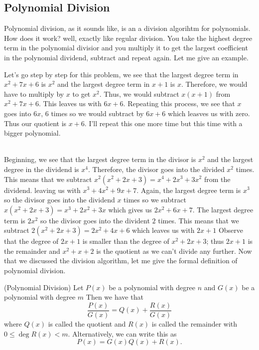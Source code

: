 \documentclass[11pt]{article}
\begin{document}
\subsection{Polynomial Division}
 Polynomial division, as it sounds like, is an a division algorihtm for polynomials. How does it work? well, exactly like regular division. You take the highest degree term in the polynomial divisior and you multiply it to get the largest coefficient in the polynomial dividend, subtract and repeat again. Let me give an example. 
\center {} \\ \raggedright Let's go step by step for this problem, we see that the largest degree term in $x^2+7x+6$ is $x^2$ and the largest degree term in $x+1$ is $x$. Therefore, we would have to multiply by $x$ to get $x^2$. Thus, we would subtract $x(x+1)$ from $x^2+7x+6$. This leaves us with $6x+6$. Repeating this process,
we see that $x$ goes into $6x$, 6 times so we would subtract by $6x+6$ which leasves us with zero. Thus our quotient is $x+6$. I'll repeat this one more time but this time with a bigger polynomial.
\\
 \center {}
 \\
 \raggedright
 Beginning, we see that the largest degree term in the divisor is $x^2$ and the largest degree in the dividend is $x^4$. Therefore, the divisor goes into the divided $x^2$ times. This means that we subtract $x^2(x^2+2x+3)=x^4+2x^3+3x^2$ from the dividend. leaving us with $x^3+4x^2+9x+7$. Again, the largest degree term is $x^3$ so the divisor goes into the dividend $x$ times so we subtract
 $x(x^2+2x+3)=x^3+2x^2+3x$ which gives us $2x^2+6x+7$. The largest degree term is $2x^2$ so the divisor goes into the divident $2$ times. This means that we subtract $2(x^2+2x+3) = 2x^2+4x+6$ which leaves us with $2x+1$ Observe that the degree of $2x+1$ is smaller than the degree of $x^2+2x+3$; thus $2x+1$ is the remainder and $x^2+x+2$ is the quotient as we can't divide any further. Now that we discussed the
 division algorithm, let me give the formal definition of polynomial division.
\begin{definition}{(Polynomial Division)}
    Let $P(x)$ be a polynomial with degree $n$ and $G(x)$ be a polynomial with degree $m$ Then we have that
    \[
        \frac{P(x)}{G(x)} = Q(x) + \frac{R(x)}{G(x)}
    \]
    where $Q(x)$ is called the quotient and $R(x)$ is called the remainder with $0 \leq \deg R(x) < m$. Alternatively, we can write this as 
    \[
    P(x) = G(x)Q(x) + R(x).
    \]
\end{definition}
\end{document}
